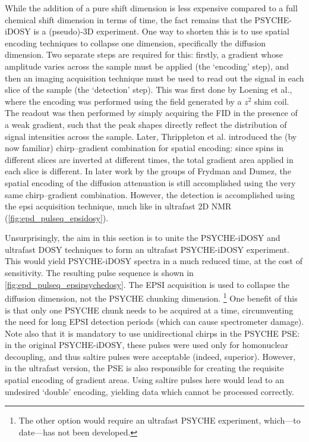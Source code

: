 While the addition of a pure shift dimension is less expensive compared to a full chemical shift dimension in terms of time, the fact remains that the PSYCHE-iDOSY is a (pseudo)-3D experiment.
One way to shorten this is to use spatial encoding techniques to collapse one dimension, specifically the diffusion dimension\autocite{Telkki2021PNMRS}.
Two separate steps are required for this: firstly, a gradient whose amplitude varies across the sample must be applied (the `encoding' step), and then an imaging acquisition technique must be used to read out the signal in each slice of the sample (the `detection' step).
This was first done by Loening et al.\autocite{Loening2001JMR}, where the encoding was performed using the field generated by a $z^2$ shim coil.
The readout was then performed by simply acquiring the FID in the presence of a weak gradient, such that the peak shapes directly reflect the distribution of signal intensities across the sample.
Later, Thrippleton et al.\autocite{Thrippleton2003MRC} introduced the (by now familiar) chirp--gradient combination for spatial encoding: since spins in different slices are inverted at different times, the total gradient area applied in each slice is different.
In later work by the groups of Frydman\autocite{Shrot2008JMR} and Dumez\autocite{Guduff2017CC,Jacquemmoz2022MRC}, the spatial encoding of the diffusion attenuation is still accomplished using the very same chirp--gradient combination.
However, the detection is accomplished using the \ac{epsi} acquisition technique\autocite{Mansfield1977JPCSSP,Stehling1991S}, much like in ultrafast 2D NMR (\cref{fig:epd_pulseq_epsidosy}).

Unsurprisingly, the aim in this section is to unite the PSYCHE-iDOSY and ultrafast DOSY techniques to form an ultrafast PSYCHE-iDOSY experiment.
This would yield PSYCHE-iDOSY spectra in a much reduced time, at the cost of sensitivity.
The resulting pulse sequence is shown in \cref{fig:epd_pulseq_epsipsychedosy}.
The EPSI acquisition is used to collapse the diffusion dimension, not the PSYCHE chunking dimension.%
\footnote{The other option would require an ultrafast PSYCHE experiment, which---to date---has not been developed.}
One benefit of this is that only one PSYCHE chunk needs to be acquired at a time, circumventing the need for long EPSI detection periods (which can cause spectrometer damage).
Note also that it is mandatory to use unidirectional chirps in the PSYCHE PSE: in the original PSYCHE-iDOSY, these pulses were used only for homonuclear decoupling, and thus saltire pulses were acceptable (indeed, superior).
However, in the ultrafast version, the PSE is also responsible for creating the requisite spatial encoding of gradient areas.
Using saltire pulses here would lead to an undesired `double' encoding, yielding data which cannot be processed correctly.

